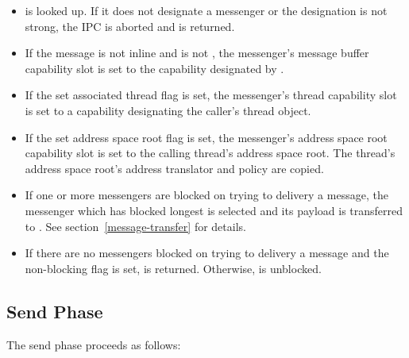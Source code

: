 \begin{itemize}

\item {} is looked up.  If it does not designate a
  messenger or the designation is not strong, the IPC is aborted and
   is returned.

\item If the message is not inline and  is not
  , the messenger's message buffer capability slot
  is set to the capability designated by .

\item If the set associated thread flag is set, the messenger's thread
  capability slot is set to a capability designating the caller's
  thread object.

\item If the set address space root flag is set, the messenger's
  address space root capability slot is set to the calling thread's
  address space root.  The thread's address space root's address
  translator and policy are copied.

\item If one or more messengers are blocked on 
  trying to delivery a message, the messenger which has blocked
  longest is selected and its payload is transferred to .  See section~\ref{message-transfer} for details.

\item If there are no messengers blocked on 
  trying to delivery a message and the non-blocking flag is set,
   is returned.  Otherwise,  is
  unblocked.

\end{itemize}

\subsection{Send Phase}

The send phase proceeds as follows:

